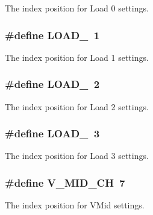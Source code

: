 The index position for Load 0 settings. \hypertarget{a00021_a363f09c63f2ecb9086b47d72a3f3f57d}{
\subsubsection[{L\-O\-A\-D\-\_\-1}]{\setlength{\rightskip}{0pt plus 5cm}\#define L\-O\-A\-D\-\_~1}}\label{a00021_a363f09c63f2ecb9086b47d72a3f3f57d}
The index position for Load 1 settings. \hypertarget{a00021_af7c1e96216e7b48160e5a03afe8ac807}{
\subsubsection[{L\-O\-A\-D\-\_\-2}]{\setlength{\rightskip}{0pt plus 5cm}\#define L\-O\-A\-D\-\_~2}}\label{a00021_af7c1e96216e7b48160e5a03afe8ac807}
The index position for Load 2 settings. \hypertarget{a00021_a2c862ec4115c4a016b61800609f236a7}{
\subsubsection[{L\-O\-A\-D\-\_\-3}]{\setlength{\rightskip}{0pt plus 5cm}\#define L\-O\-A\-D\-\_~3}}\label{a00021_a2c862ec4115c4a016b61800609f236a7}
The index position for Load 3 settings. \hypertarget{a00021_a1ae2d3caef45c64fbb9175c50c27ce09}{
\subsubsection[{V\-\_\-\-M\-I\-D\-\_\-\-C\-H}]{\setlength{\rightskip}{0pt plus 5cm}\#define V\-\_\-\-M\-I\-D\-\_\-\-C\-H~7}}\label{a00021_a1ae2d3caef45c64fbb9175c50c27ce09}
The index position for V\-Mid settings. 


